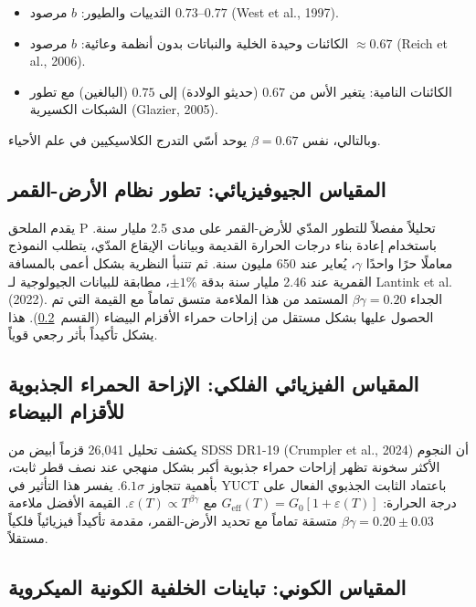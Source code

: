 \documentclass[11pt,a4paper]{article}
\begin{document}
	\begin{itemize}
		\item الثدييات والطيور: $b$ مرصود $0.73$–$0.77$ (West et al., 1997).
		\item الكائنات وحيدة الخلية والنباتات بدون أنظمة وعائية: $b$ مرصود $\approx 0.67$ (Reich et al., 2006).
		\item الكائنات النامية: يتغير الأس من $0.67$ (حديثو الولادة) إلى $0.75$ (البالغين) مع تطور الشبكات الكسيرية (Glazier, 2005).
	\end{itemize}
	
	وبالتالي، نفس $\beta = 0.67$ يوحد أسّي التدرج الكلاسيكيين في علم الأحياء.
	
	\subsection{المقياس الجيوفيزيائي: تطور نظام الأرض-القمر}
	\label{subsec:earth-moon}
	
	يقدم الملحق P تحليلاً مفصلاً للتطور المدّي للأرض-القمر على مدى 2.5 مليار سنة. باستخدام إعادة بناء درجات الحرارة القديمة وبيانات الإيقاع المدّي، يتطلب النموذج معاملًا حرًا واحدًا $\gamma$، يُعاير عند 650 مليون سنة. ثم تتنبأ النظرية بشكل أعمى بالمسافة القمرية عند 2.46 مليار سنة بدقة $\pm 1\%$، مطابقة للبيانات الجيولوجية لـ Lantink et al. (2022). الجداء $\beta\gamma = 0.20$ المستمد من هذا الملاءمة متسق تماماً مع القيمة التي تم الحصول عليها بشكل مستقل من إزاحات حمراء الأقزام البيضاء (القسم~\ref{subsec:wd}). هذا يشكل تأكيداً بأثر رجعي قوياً.
	
	\subsection{المقياس الفيزيائي الفلكي: الإزاحة الحمراء الجذبوية للأقزام البيضاء}
	\label{subsec:wd}
	
	يكشف تحليل 26,041 قزماً أبيض من SDSS DR1-19 (Crumpler et al., 2024) أن النجوم الأكثر سخونة تظهر إزاحات حمراء جذبوية أكبر بشكل منهجي عند نصف قطر ثابت، بأهمية تتجاوز $6.1\sigma$. يفسر هذا التأثير في YUCT باعتماد الثابت الجذبوي الفعال على درجة الحرارة: $G_{\mathrm{eff}}(T) = G_0[1 + \varepsilon(T)]$ مع $\varepsilon(T) \propto T^{\beta\gamma}$. القيمة الأفضل ملاءمة $\beta\gamma = 0.20 \pm 0.03$ متسقة تماماً مع تحديد الأرض-القمر، مقدمة تأكيداً فيزيائياً فلكياً مستقلاً.
	
	\subsection{المقياس الكوني: تباينات الخلفية الكونية الميكروية}
	\label{subsec:cmb}
	
\end{document}
